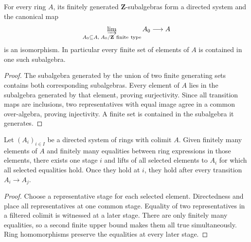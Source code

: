 \begin{lemma}
  \label{lemma:nagata-ring-finite-type-subalgebras}

  For every ring $A$, its finitely generated $\mathbf Z$-subalgebras form a
  directed system and the canonical map
  \[
    \varinjlim_{A_0\subseteq A,\;A_0/\mathbf Z\ \mathrm{finite\ type}}A_0
      \longrightarrow A
  \]
  is an isomorphism.  In particular every finite set of elements of $A$ is
  contained in one such subalgebra.
\end{lemma}

\begin{proof}
  The subalgebra generated by the union of two finite generating sets contains
  both corresponding subalgebras.  Every element of $A$ lies in the
  subalgebra generated by that element, proving surjectivity.  Since all
  transition maps are inclusions, two representatives with equal image agree
  in a common over-algebra, proving injectivity.  A finite set is contained in
  the subalgebra it generates.
\end{proof}

\begin{lemma}
  \label{lemma:nagata-filtered-colimit-finite-data}

  Let $(A_i)_{i\in I}$ be a directed system of rings with colimit $A$.  Given
  finitely many elements of $A$ and finitely many equalities between ring
  expressions in those elements, there exists one stage $i$ and lifts of all
  selected elements to $A_i$ for which all selected equalities hold.  Once
  they hold at $i$, they hold after every transition $A_i\to A_j$.
\end{lemma}

\begin{proof}
  Choose a representative stage for each selected element.  Directedness and
   place all representatives at
  one common stage.  Equality of two representatives in a filtered colimit is
  witnessed at a later stage.  There are only finitely many equalities, so a
  second finite upper bound makes them all true simultaneously.  Ring
  homomorphisms preserve the equalities at every later stage.
\end{proof}

